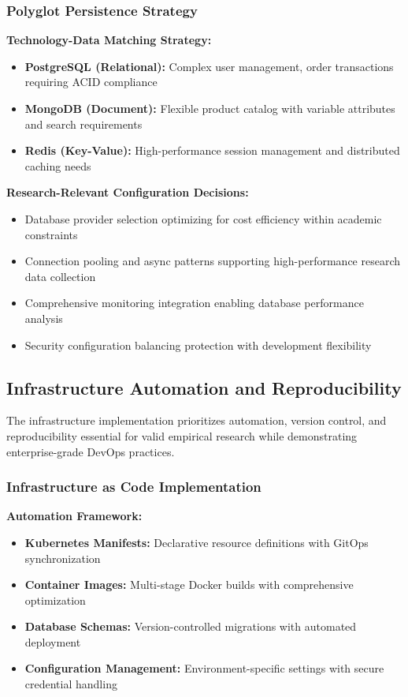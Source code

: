 \subsubsection{Polyglot Persistence Strategy}

\textbf{Technology-Data Matching Strategy:}
\begin{itemize}
\item \textbf{PostgreSQL (Relational):} Complex user management, order transactions requiring ACID compliance
\item \textbf{MongoDB (Document):} Flexible product catalog with variable attributes and search requirements
\item \textbf{Redis (Key-Value):} High-performance session management and distributed caching needs
\end{itemize}

\textbf{Research-Relevant Configuration Decisions:}
\begin{itemize}
\item Database provider selection optimizing for cost efficiency within academic constraints
\item Connection pooling and async patterns supporting high-performance research data collection
\item Comprehensive monitoring integration enabling database performance analysis
\item Security configuration balancing protection with development flexibility
\end{itemize}

\subsection{Infrastructure Automation and Reproducibility}

The infrastructure implementation prioritizes automation, version control, and reproducibility essential for valid empirical research while demonstrating enterprise-grade DevOps practices.

\subsubsection{Infrastructure as Code Implementation}

\textbf{Automation Framework:}
\begin{itemize}
\item \textbf{Kubernetes Manifests:} Declarative resource definitions with GitOps synchronization
\item \textbf{Container Images:} Multi-stage Docker builds with comprehensive optimization
\item \textbf{Database Schemas:} Version-controlled migrations with automated deployment
\item \textbf{Configuration Management:} Environment-specific settings with secure credential handling
\end{itemize}

